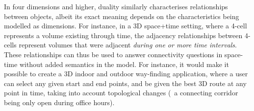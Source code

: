 In four dimensions and higher, duality similarly characterises relationships between objects, albeit its exact meaning depends on the characteristics being modelled as dimensions.
For instance, in a 3D space+time setting, where a 4-cell represents a volume existing through time, the adjacency relationships between 4-cells represent volumes that were adjacent \emph{during one or more time intervals}.
These relationships can thus be used to answer connectivity questions in space-time without added semantics in the model.
For instance, it would make it possible to create a 3D indoor and outdoor way-finding application, where a user can select any given start and end points, and be given the best 3D route at any point in time, taking into account topological changes (\eg\ a connecting corridor being only open during office hours).

